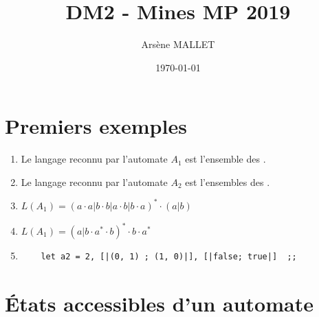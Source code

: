 \documentclass{article}
\title{DM2 - Mines MP 2019}
\date{\today}
\author{Arsène MALLET}
\begin{document}
\thispagestyle{firstpage}

\begin{center}
    \huge\bfseries{\@title}
\end{center}

\section{Premiers exemples}

\begin{enumerate}
    \item Le langage reconnu par l'automate $A_1$ est l'ensemble des .
    \item Le langage reconnu par l'automate $A_2$ est l'ensembles des .
    \item $\boxed{L(A_1) = (a \cdot a|b \cdot b|a \cdot b|b \cdot a)^* \cdot (a|b)}$
    \item $\boxed{L(A_1) = (a|b \cdot a^* \cdot b)^*\cdot b\cdot a^*}$
    \item \begin{verbatim}
    let a2 = 2, [|(0, 1) ; (1, 0)|], [|false; true|]  ;;
    \end{verbatim}
\end{enumerate}

\section{\'Etats accessibles d'un automate}
\end{document}
